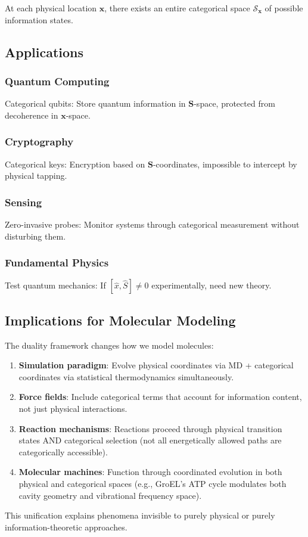 At each physical location $\mathbf{x}$, there exists an entire categorical space $\mathcal{S}_{\mathbf{x}}$ of possible information states.

\subsection{Applications}

\subsubsection{Quantum Computing}

Categorical qubits: Store quantum information in $\mathbf{S}$-space, protected from decoherence in $\mathbf{x}$-space.

\subsubsection{Cryptography}

Categorical keys: Encryption based on $\mathbf{S}$-coordinates, impossible to intercept by physical tapping.

\subsubsection{Sensing}

Zero-invasive probes: Monitor systems through categorical measurement without disturbing them.

\subsubsection{Fundamental Physics}

Test quantum mechanics: If $[\hat{x}, \hat{S}] \neq 0$ experimentally, need new theory.

\subsection{Implications for Molecular Modeling}

The duality framework changes how we model molecules:

\begin{enumerate}
\item \textbf{Simulation paradigm}: Evolve physical coordinates via MD + categorical coordinates via statistical thermodynamics simultaneously.

\item \textbf{Force fields}: Include categorical terms that account for information content, not just physical interactions.

\item \textbf{Reaction mechanisms}: Reactions proceed through physical transition states AND categorical selection (not all energetically allowed paths are categorically accessible).

\item \textbf{Molecular machines}: Function through coordinated evolution in both physical and categorical spaces (e.g., GroEL's ATP cycle modulates both cavity geometry and vibrational frequency space).
\end{enumerate}

This unification explains phenomena invisible to purely physical or purely information-theoretic approaches.
